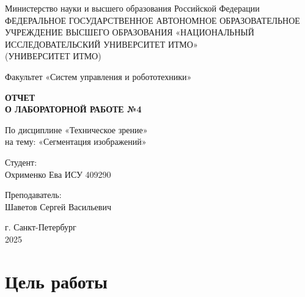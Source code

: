 \documentclass[a4paper,12pt]{article}
\begin{document}
\begin{titlepage}
    \centering
    \vspace*{1cm}

    {\large Министерство науки и высшего образования Российской Федерации}\\
    {\large ФЕДЕРАЛЬНОЕ ГОСУДАРСТВЕННОЕ АВТОНОМНОЕ ОБРАЗОВАТЕЛЬНОЕ УЧРЕЖДЕНИЕ ВЫСШЕГО ОБРАЗОВАНИЯ «НАЦИОНАЛЬНЫЙ ИССЛЕДОВАТЕЛЬСКИЙ УНИВЕРСИТЕТ ИТМО»}\\
    {\large (УНИВЕРСИТЕТ ИТМО)}\\

    \vspace{2cm}

    {\large Факультет «Систем управления и робототехники»}\\

    \vspace{3cm}

    \textbf{{\Huge ОТЧЕТ}\\
    {\Huge О ЛАБОРАТОРНОЙ РАБОТЕ №4}}\\

    \vspace{1cm}

    {\LARGE По дисциплине «Техническое зрение»}\\
    {\LARGE на тему: «Сегментация изображений»}\\

    \vspace{2cm}

    {\Large Студент:}\\
    Охрименко Ева ИСУ 409290\\

    \vspace{2cm}

    {\Large Преподаватель:}\\
    Шаветов Сергей Васильевич\\

    \vspace{4cm}

    {\large г. Санкт-Петербург}\\
    {\large 2025}

\end{titlepage}

\tableofcontents  %
\newpage

\section{Цель работы}
\end{document}
